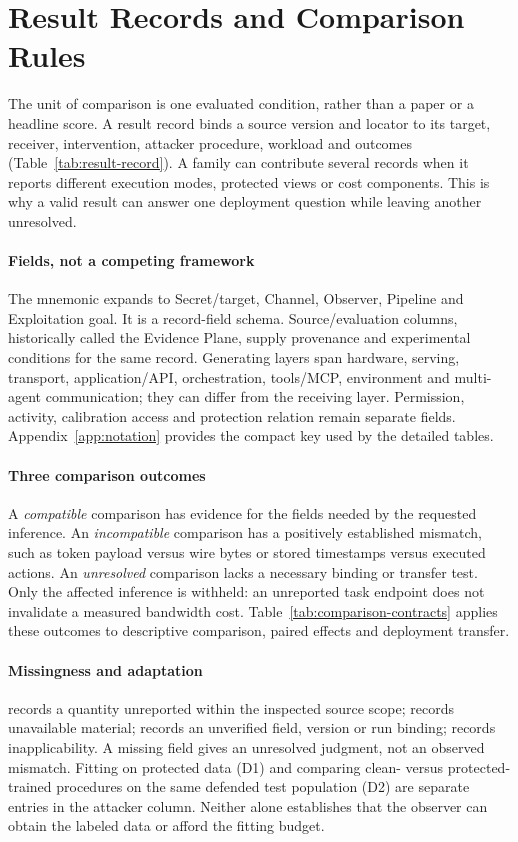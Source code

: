 \section{Result Records and Comparison Rules}\label{sec:scope}
The unit of comparison is one evaluated condition, rather than a paper or a headline score. A result record binds a source version and locator to its target, receiver, intervention, attacker procedure, workload and outcomes (Table~\ref{tab:result-record}). A family can contribute several records when it reports different execution modes, protected views or cost components. This is why a valid result can answer one deployment question while leaving another unresolved.


\paragraph{Fields, not a competing framework}
The mnemonic \scope{} expands to Secret/target, Channel, Observer, Pipeline and Exploitation goal. It is a record-field schema. Source/evaluation columns, historically called the Evidence Plane, supply provenance and experimental conditions for the same record. Generating layers span hardware, serving, transport, application/API, orchestration, tools/MCP, environment and multi-agent communication; they can differ from the receiving layer. Permission, activity, calibration access and protection relation remain separate fields. Appendix~\ref{app:notation} provides the compact key used by the detailed tables.

\paragraph{Three comparison outcomes}
A \emph{compatible} comparison has evidence for the fields needed by the requested inference. An \emph{incompatible} comparison has a positively established mismatch, such as token payload versus wire bytes or stored timestamps versus executed actions. An \emph{unresolved} comparison lacks a necessary binding or transfer test. Only the affected inference is withheld: an unreported task endpoint does not invalidate a measured bandwidth cost. Table~\ref{tab:comparison-contracts} applies these outcomes to descriptive comparison, paired effects and deployment transfer.


\paragraph{Missingness and adaptation}
\NRR{} records a quantity unreported within the inspected source scope; \NRA{} records unavailable material; \NRV{} records an unverified field, version or run binding; \NA{} records inapplicability. A missing field gives an unresolved judgment, not an observed mismatch. Fitting on protected data (D1) and comparing clean- versus protected-trained procedures on the same defended test population (D2) are separate entries in the attacker column. Neither alone establishes that the observer can obtain the labeled data or afford the fitting budget.

